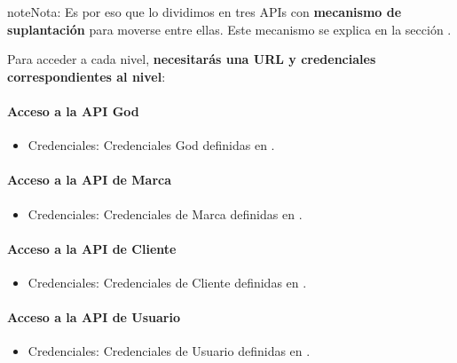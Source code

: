 \documentclass[letterpaper,10pt,spanish]{sphinxmanual}
\begin{document}
\begin{notice}{note}{Nota:}
Es por eso que lo dividimos en tres APIs con \textbf{mecanismo de suplantación} para moverse entre ellas. Este mecanismo se explica en la sección {\hyperref[api_rest/use_case:use\string-case]{}}.
\end{notice}

Para acceder a cada nivel, \textbf{necesitarás una URL y credenciales correspondientes al nivel}:
\paragraph{Acceso a la API God}
\begin{itemize}
\item {} 
Credenciales: Credenciales God definidas en {\hyperref[administration_portal/platform/main_operators:main\string-operators]{}}.

\end{itemize}
\paragraph{Acceso a la API de Marca}
\begin{itemize}
\item {} 
Credenciales: Credenciales de Marca definidas en {\hyperref[administration_portal/platform/brands:brand\string-operators]{}}.

\end{itemize}
\paragraph{Acceso a la API de Cliente}
\begin{itemize}
\item {} 
Credenciales: Credenciales de Cliente definidas en {\hyperref[administration_portal/brand/clients/operators:client\string-operators]{}}.

\end{itemize}
\paragraph{Acceso a la API de Usuario}
\begin{itemize}
\item {} 
Credenciales: Credenciales de Usuario definidas en {\hyperref[administration_portal/client/vpbx/users:users]{}}.

\end{itemize}
\end{document}
